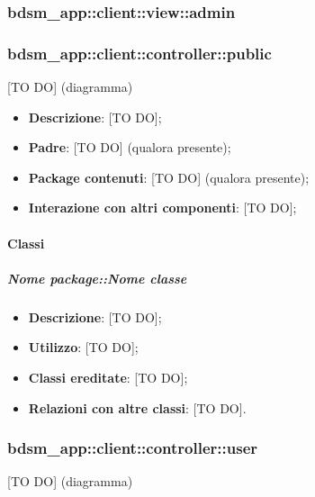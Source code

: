 	\subsubsection{bdsm\_app::client::view::admin} %
	\label{ssub:bdsm_app_client_view_admin}
	



	\subsubsection{bdsm\_app::client::controller::public} %
	\label{ssub:bdsm_app_client_controller_public}
	[TO DO] (diagramma) \newline \newline

	\begin{itemize}
		\item \textbf{Descrizione}: [TO DO];
		\item \textbf{Padre}: [TO DO] (qualora presente);
		\item \textbf{Package contenuti}: [TO DO] (qualora presente);
		\item \textbf{Interazione con altri componenti}: [TO DO];
	\end{itemize}

		\paragraph{Classi} %
			\subparagraph{Nome package::Nome classe} %
			\label{subp:subparagraph_name}
				\begin{itemize}
					\item \textbf{Descrizione}: [TO DO];
					\item \textbf{Utilizzo}: [TO DO];
					\item \textbf{Classi ereditate}: [TO DO];
					\item \textbf{Relazioni con altre classi}: [TO DO].
				\end{itemize}



	\subsubsection{bdsm\_app::client::controller::user} %
	\label{ssub:bdsm_app_client_controller_user}
	[TO DO] (diagramma) \newline \newline

